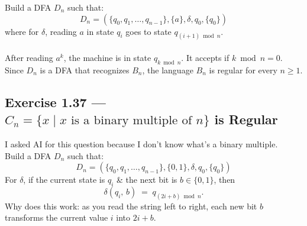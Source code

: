 \documentclass[12pt]{article}
\begin{document}
Build a DFA $D_n$ such that:
\[D_n=(\{q_0, q_1, \ldots, q_{n-1}\},\{a\},\delta,q_0,\{q_0\})\]
where for $\delta$, reading $a$ in state $q_i$ goes to state $q_{(i+1)\bmod n}$.\\\\
After reading $a^k$, the machine is in state $q_{k \bmod n}$.
It accepts if $k \bmod n = 0$.
Since $D_n$ is a DFA that recognizes $B_n$, the language $B_n$ is regular for every $n \ge 1$. 

\subsection*{Exercise 1.37 --- $C_n = \{x \mid x \text{ is a binary multiple of } n\}$ is Regular}
I asked AI for this question because I don't know what's a binary multiple.\\
Build a DFA $D_n$ such that:
\[D_n=(\{q_0, q_1, \ldots, q_{n-1}\},\{0,1\},\delta,q_0,\{q_0\})\]
For $\delta$, if the current state is $q_i$ \& the next bit is $b \in \{0,1\}$, then
        \[
          \delta(q_i,\, b) \;=\; q_{(2i + b)\bmod n}.
        \]
Why does this work: as you read the string left to right, each new bit $b$ transforms the current value $i$ into
$2i+b$.
\end{document}
